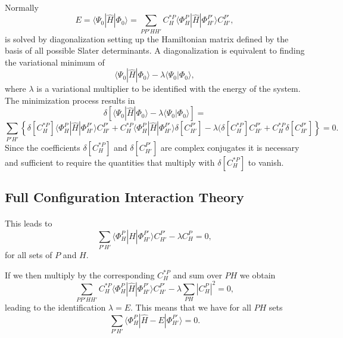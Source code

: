 \paragraph{}
Normally 
\[
E= \langle \Psi_0 | \hat{H} |\Phi_0 \rangle= \sum_{PP'HH'}C_H^{*P}\langle \Phi_H^P | \hat{H} |\Phi_{H'}^{P'} \rangle C_{H'}^{P'},
\]
is solved by diagonalization setting up the Hamiltonian matrix defined by the basis of all possible Slater determinants. A diagonalization
is equivalent to finding the variational minimum   of 
\[
 \langle \Psi_0 | \hat{H} |\Phi_0 \rangle-\lambda \langle \Psi_0 |\Phi_0 \rangle,
\]
where $\lambda$ is a variational multiplier to be identified with the energy of the system.
The minimization process results in 
\[
\delta\left[ \langle \Psi_0 | \hat{H} |\Phi_0 \rangle-\lambda \langle \Psi_0 |\Phi_0 \rangle\right]=
\]
\[
\sum_{P'H'}\left\{\delta[C_H^{*P}]\langle \Phi_H^P | \hat{H} |\Phi_{H'}^{P'} \rangle C_{H'}^{P'}+
C_H^{*P}\langle \Phi_H^P | \hat{H} |\Phi_{H'}^{P'} \rangle \delta[C_{H'}^{P'}]-
\lambda( \delta[C_H^{*P}]C_{H'}^{P'}+C_H^{*P}\delta[C_{H'}^{P'}]\right\} = 0.
\]
Since the coefficients $\delta[C_H^{*P}]$ and $\delta[C_{H'}^{P'}]$ are complex conjugates it is necessary and sufficient to require the quantities that multiply with $\delta[C_H^{*P}]$ to vanish.



\subsection*{Full Configuration Interaction Theory}

\paragraph{}

This leads to 
\[
\sum_{P'H'}\langle \Phi_H^P | \hat{H} |\Phi_{H'}^{P'} \rangle C_{H'}^{P'}-\lambda C_H^{P}=0,
\]
for all sets of $P$ and $H$.

If we then multiply by the corresponding $C_H^{*P}$ and sum over $PH$ we obtain
\[ 
\sum_{PP'HH'}C_H^{*P}\langle \Phi_H^P | \hat{H} |\Phi_{H'}^{P'} \rangle C_{H'}^{P'}-\lambda\sum_{PH}|C_H^P|^2=0,
\]
leading to the identification $\lambda = E$. This means that we have for all $PH$ sets
\begin{equation}
\sum_{P'H'}\langle \Phi_H^P | \hat{H} -E|\Phi_{H'}^{P'} \rangle = 0. \label{eq:fullci}
\end{equation}



